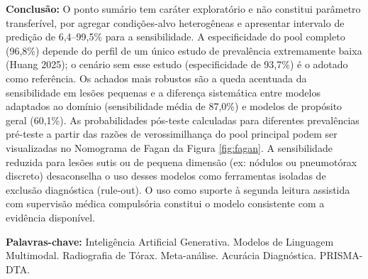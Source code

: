 \documentclass[12pt,a4paper]{article}
\begin{document}
\begin{singlespace}
\noindent \textbf{Conclusão:} O ponto sumário tem caráter exploratório e não constitui parâmetro transferível, por agregar condições-alvo heterogêneas e apresentar intervalo de predição de 6,4--99,5\% para a sensibilidade. A especificidade do pool completo (96,8\%) depende do perfil de um único estudo de prevalência extremamente baixa (Huang 2025); o cenário sem esse estudo (especificidade de 93,7\%) é o adotado como referência. Os achados mais robustos são a queda acentuada da sensibilidade em lesões pequenas e a diferença sistemática entre modelos adaptados ao domínio (sensibilidade média de 87,0\%) e modelos de propósito geral (60,1\%). As probabilidades pós-teste calculadas para diferentes prevalências pré-teste a partir das razões de verossimilhança do pool principal podem ser visualizadas no Nomograma de Fagan da Figura \ref{fig:fagan}. A sensibilidade reduzida para lesões sutis ou de pequena dimensão (ex: nódulos ou pneumotórax discreto) desaconselha o uso desses modelos como ferramentas isoladas de exclusão diagnóstica (rule-out). O uso como suporte à segunda leitura assistida com supervisão médica compulsória constitui o modelo consistente com a evidência disponível.

\vspace{0.8cm}
\noindent \textbf{Palavras-chave:} Inteligência Artificial Generativa. Modelos de Linguagem Multimodal. Radiografia de Tórax. Meta-análise. Acurácia Diagnóstica. PRISMA-DTA.
\end{singlespace}
\end{document}
